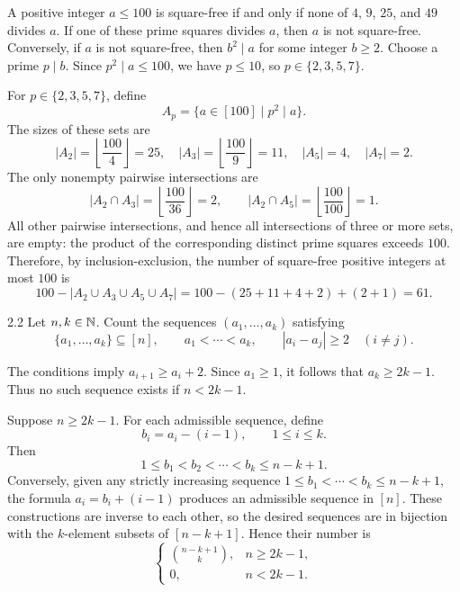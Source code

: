 \documentclass[11pt,oneside]{article}
\begin{document}
\begin{solution}
A positive integer $a\leq100$ is square-free if and only if none of $4$, $9$, $25$, and $49$ divides $a$. If one of these prime squares divides $a$, then $a$ is not square-free. Conversely, if $a$ is not square-free, then $b^2\mid a$ for some integer $b\geq2$. Choose a prime $p\mid b$. Since $p^2\mid a\leq100$, we have $p\leq10$, so $p\in\{2,3,5,7\}$.

For $p\in\{2,3,5,7\}$, define
\[
    A_p=\{a\in[100]\mid p^2\mid a\}.
\]
The sizes of these sets are
\[
    |A_2|=\left\lfloor\frac{100}{4}\right\rfloor=25,
    \quad |A_3|=\left\lfloor\frac{100}{9}\right\rfloor=11,
    \quad |A_5|=4,
    \quad |A_7|=2.
\]
The only nonempty pairwise intersections are
\[
    |A_2\cap A_3|=\left\lfloor\frac{100}{36}\right\rfloor=2,
    \qquad
    |A_2\cap A_5|=\left\lfloor\frac{100}{100}\right\rfloor=1.
\]
All other pairwise intersections, and hence all intersections of three or more sets, are empty: the product of the corresponding distinct prime squares exceeds $100$. Therefore, by inclusion-exclusion, the number of square-free positive integers at most $100$ is
\[
    100-|A_2\cup A_3\cup A_5\cup A_7|
    =100-(25+11+4+2)+(2+1)
    =61.
\]
\end{solution}

\begin{problem}{2.2}
Let $n,k\in\mathbb{N}$. Count the sequences $(a_1,\ldots,a_k)$ satisfying
\[
    \{a_1,\ldots,a_k\}\subseteq[n],
    \qquad a_1<\cdots<a_k,
    \qquad |a_i-a_j|\geq2\quad(i\neq j).
\]
\end{problem}

\begin{solution}
The conditions imply $a_{i+1}\geq a_i+2$. Since $a_1\geq1$, it follows that $a_k\geq2k-1$. Thus no such sequence exists if $n<2k-1$.

Suppose $n\geq2k-1$. For each admissible sequence, define
\[
    b_i=a_i-(i-1),\qquad 1\leq i\leq k.
\]
Then
\[
    1\leq b_1<b_2<\cdots<b_k\leq n-k+1.
\]
Conversely, given any strictly increasing sequence $1\leq b_1<\cdots<b_k\leq n-k+1$, the formula $a_i=b_i+(i-1)$ produces an admissible sequence in $[n]$. These constructions are inverse to each other, so the desired sequences are in bijection with the $k$-element subsets of $[n-k+1]$. Hence their number is
\[
    \begin{cases}
        \displaystyle\binom{n-k+1}{k}, & n\geq2k-1,\\[5pt]
        0, & n<2k-1.
    \end{cases}
\]
\end{solution}
\end{document}
